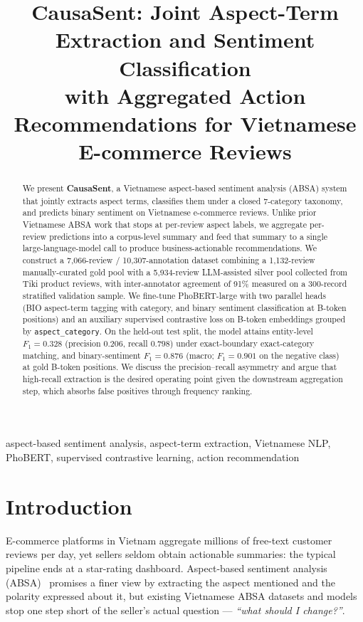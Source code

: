\documentclass[conference]{IEEEtran}
\title{CausaSent: Joint Aspect-Term Extraction and Sentiment Classification\\
       with Aggregated Action Recommendations for Vietnamese E-commerce Reviews}
\author{
\IEEEauthorblockN{Anonymous Submission}
\IEEEauthorblockA{\textit{Affiliation withheld for double-blind review}\\
\textit{Email withheld}}
}
\begin{document}
\maketitle

\begin{abstract}
We present \textbf{CausaSent}, a Vietnamese aspect-based sentiment
analysis (ABSA) system that jointly extracts aspect terms, classifies
them under a closed 7-category taxonomy, and predicts binary sentiment
on Vietnamese e-commerce reviews. Unlike prior Vietnamese ABSA work
that stops at per-review aspect labels, we aggregate per-review
predictions into a corpus-level summary and feed that summary to a
single large-language-model call to produce business-actionable
recommendations. We construct a 7{,}066-review / 10{,}307-annotation
dataset combining a 1{,}132-review manually-curated gold pool with a
5{,}934-review LLM-assisted silver pool collected from Tiki product
reviews, with inter-annotator agreement of 91\% measured on a 300-record
stratified validation sample. We fine-tune PhoBERT-large with two
parallel heads (BIO aspect-term tagging with category, and binary
sentiment classification at B-token positions) and an auxiliary
supervised contrastive loss on B-token embeddings grouped by
\texttt{aspect\_category}.
On the held-out test split, the model attains entity-level
$F_1 = 0.328$ (precision $0.206$, recall $0.798$) under exact-boundary
exact-category matching, and binary-sentiment $F_1 = 0.876$ (macro;
$F_1 = 0.901$ on the negative class) at gold B-token positions. We
discuss the precision--recall asymmetry and argue that high-recall
extraction is the desired operating point given the downstream
aggregation step, which absorbs false positives through frequency
ranking.
\end{abstract}

\begin{IEEEkeywords}
aspect-based sentiment analysis, aspect-term extraction,
Vietnamese NLP, PhoBERT, supervised contrastive learning,
action recommendation
\end{IEEEkeywords}

\section{Introduction}

E-commerce platforms in Vietnam aggregate millions of free-text customer
reviews per day, yet sellers seldom obtain actionable summaries: the
typical pipeline ends at a star-rating dashboard. Aspect-based sentiment
analysis (ABSA)~\cite{pontiki2014semeval} promises a finer view by
extracting the aspect mentioned and the polarity expressed about it, but
existing Vietnamese ABSA datasets and models stop one step short of the
seller's actual question --- \emph{``what should I change?''}.
\end{document}
